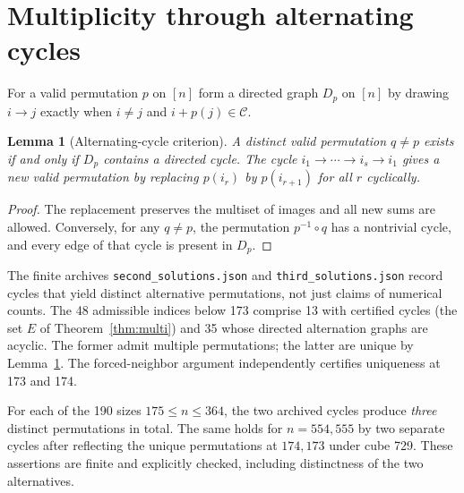 \documentclass[9pt]{extarticle}
\newtheorem{lemma}[theorem]{Lemma}
\newcommand{\C}{\mathcal C}
\begin{document}
\section{Multiplicity through alternating cycles}\label{sec:multi}
For a valid permutation $p$ on $[n]$ form a directed graph $D_p$ on $[n]$ by drawing $i\to j$ exactly when $i\ne j$ and $i+p(j)\in\C$.
\begin{lemma}[Alternating-cycle criterion]\label{lem:cycle}
A distinct valid permutation $q\ne p$ exists if and only if $D_p$ contains a directed cycle. The cycle $i_1\to\cdots\to i_s\to i_1$ gives a new valid permutation by replacing $p(i_r)$ by $p(i_{r+1})$ for all $r$ cyclically.
\end{lemma}
\begin{proof}
The replacement preserves the multiset of images and all new sums are allowed. Conversely, for any $q\ne p$, the permutation $p^{-1}\circ q$ has a nontrivial cycle, and every edge of that cycle is present in $D_p$.
\end{proof}

The finite archives \texttt{second\_solutions.json} and \texttt{third\_solutions.json} record cycles that yield distinct alternative permutations, not just claims of numerical counts. The 48 admissible indices below 173 comprise 13 with certified cycles (the set $E$ of Theorem~\ref{thm:multi}) and 35 whose directed alternation graphs are acyclic. The former admit multiple permutations; the latter are unique by Lemma~\ref{lem:cycle}. The forced-neighbor argument independently certifies uniqueness at 173 and 174.

For each of the 190 sizes $175\le n\le364$, the two archived cycles produce \emph{three} distinct permutations in total. The same holds for $n=554,555$ by two separate cycles after reflecting the unique permutations at $174,173$ under cube 729. These assertions are finite and explicitly checked, including distinctness of the two alternatives.
\end{document}
